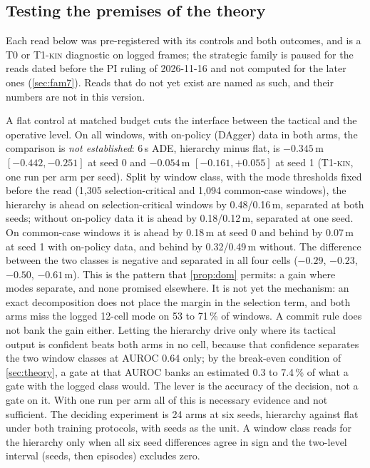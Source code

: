 \documentclass[10pt,twocolumn]{article}
\makeatletter
\theoremstyle{remark}
\newcommand{\tier}[1]{\textsc{\small #1}}
\renewcommand\paragraph{\@startsection{paragraph}{4}{\z@}{1.6ex \@plus .5ex \@minus .2ex}{-1em}{\normalfont\normalsize\bfseries}}
\makeatother
\begin{document}
\subsection{Testing the premises of the theory}\label{sec:premises}
Each read below was pre-registered with its controls and both outcomes, and is a \tier{T0} or \tier{T1-kin} diagnostic on logged
frames; the strategic family is paused for the reads dated before the PI ruling of 2026-11-16 and not computed for the later ones (\cref{sec:fam7}). Reads that do not yet exist are named as such, and their numbers are not in this version.

\paragraph{Hierarchy against a flat control (T2).} A flat control at matched budget cuts the interface between the tactical and the
operative level. On all windows, with on-policy (DAgger) data in both arms, the comparison is \emph{not established}: 6\,s ADE,
hierarchy minus flat, is $-0.345$\,m $[-0.442,-0.251]$ at seed 0 and $-0.054$\,m $[-0.161,+0.055]$ at seed 1 (\tier{T1-kin}, one run
per arm per seed). Split by window class, with the mode thresholds fixed before the read (1,305 selection-critical and 1,094
common-case windows), the hierarchy is ahead on selection-critical windows by 0.48/0.16\,m, separated at both seeds; without
on-policy data it is ahead by 0.18/0.12\,m, separated at one seed. On common-case windows it is ahead by 0.18\,m at seed 0 and behind
by 0.07\,m at seed 1 with on-policy data, and behind by 0.32/0.49\,m without. The difference between the two classes is negative and
separated in all four cells ($-0.29$, $-0.23$, $-0.50$, $-0.61$\,m). This is the pattern that \cref{prop:dom} permits: a gain where
modes separate, and none promised elsewhere. It is not yet the mechanism: an exact decomposition does not place the margin in the
selection term, and both arms miss the logged 12-cell mode on 53 to 71\,\% of windows. A commit rule does not bank the gain either.
Letting the hierarchy drive only where its tactical output is confident beats both arms in no cell, because that confidence
separates the two window classes at AUROC 0.64 only; by the break-even condition of \cref{sec:theory}, a gate at that AUROC banks an
estimated 0.3 to 7.4\,\% of what a gate with the logged class would. The lever is the accuracy of the decision, not a gate on it.
With one run per arm all of this is necessary evidence and not sufficient. The deciding experiment is 24 arms at six seeds, hierarchy against flat under both training protocols,
with seeds as the unit. A window class
reads for the hierarchy only when all six seed differences agree in sign and the two-level interval (seeds, then episodes) excludes zero.
\end{document}
